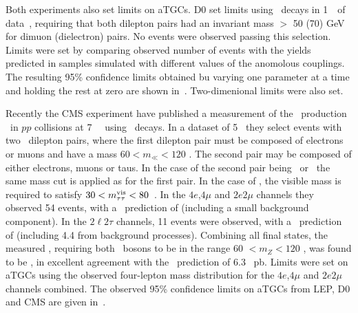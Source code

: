 Both experiments also set limits on aTGCs. D0 set limits using
\ZZllll\ decays in 1~\ifb\ of data~\cite{Abazov:2007ad}, requiring that
both dilepton pairs had an invariant mass $>$ 50 (70) GeV for dimuon (dielectron)
pairs. No events were observed passing this selection. 
Limits were set by comparing observed number of events with the yields predicted in
samples simulated with different values of the anomolous couplings.
 The resulting 95\% confidence limits obtained bu varying one
parameter at a time and holding the rest at zero are shown
in~. Two-dimenional limits were also
set.


Recently the CMS experiment have published a measurement of the \ZZ\ production
\cx\ in $pp$ collisions at 7~\tev~\cite{Chatrchyan:1495152} using
\ZZllll\ decays. In a dataset of 5 \ifb\ they select events with two \ossf\ dilepton
pairs, where the first dilepton pair must be composed of electrons or muons and
have a mass $60 < m_{\ll} < 120$ \gev. The second pair may be composed of either
electrons, muons or taus. In the case of the second pair being \ee\ or \mm\ the
same mass cut is applied as for the first pair. In the case of \tautau, the
visible mass is required to satisfy $30 < m_{\tau\tau}^{\rm{vis}} < 80$~\gev.
In the $4e$,$4\mu$ and $2e2\mu$ channels they observed 54 events, with a \sm\ prediction of
 (including a small background
component). In the $2\ell2\tau$ channels,
11 events were observed, with a \sm\ prediction of
 (including 4.4 from background
processes). Combining all final states, the measured \cx, requiring both \Z\
bosons to be in the range 60 $< m_{Z} < 120$ \gev, was found to be ,
in excellent agreement with the \sm\ prediction of 6.3 \errSym{0.4}~pb. Limits
were set on aTGCs using the observed four-lepton mass distribution for the
$4e$,$4\mu$ and $2e2\mu$ channels combined. The observed 95\% confidence limits
on aTGCs from LEP, D0 and CMS are given in~\tab{prev-tgc-limits}.

